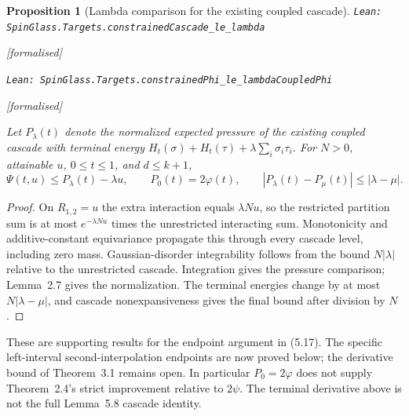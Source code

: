 \documentclass[11pt]{article}
\providecommand{\lean}[1]{\leavevmode\par\nopagebreak
  {\noindent\normalfont\footnotesize\raggedright\texttt{Lean: #1}\par}\nopagebreak}
\providecommand{\leanok}{\par\nopagebreak
  {\noindent\normalfont\footnotesize\textcolor{green!50!black}{[formalised]}\par}\nopagebreak}
\newtheorem{proposition}[theorem]{Proposition}
\begin{document}
\begin{proposition}[Lambda comparison for the existing coupled cascade]
\lean{SpinGlass.Targets.constrainedCascade\_le\_lambda}\leanok
\lean{SpinGlass.Targets.constrainedPhi\_le\_lambdaCoupledPhi}\leanok
Let $P_{\lambda}(t)$ denote the normalized expected pressure of the existing
coupled cascade with terminal energy
$H_t(\sigma)+H_t(\tau)+\lambda\sum_i\sigma_i\tau_i$.
For $N>0$, attainable $u$, $0\le t\le1$, and $d\le k+1$,
\[
\Psi(t,u)\le P_{\lambda}(t)-\lambda u,\qquad
P_0(t)=2\varphi(t),\qquad
|P_{\lambda}(t)-P_{\mu}(t)|\le|\lambda-\mu|.
\]
\end{proposition}
\begin{proof}
On $R_{1,2}=u$ the extra interaction equals $\lambda Nu$, so the restricted
partition sum is at most $e^{-\lambda Nu}$ times the unrestricted interacting
sum. Monotonicity and additive-constant equivariance propagate this through
every cascade level, including zero mass. Gaussian-disorder integrability
follows from the bound $N|\lambda|$ relative to the unrestricted cascade.
Integration gives the pressure comparison; Lemma~2.7 gives the normalization.
The terminal energies change by at most $N|\lambda-\mu|$, and cascade
nonexpansiveness gives the final bound after division by $N$.
\end{proof}

These are supporting results for the endpoint argument in (5.17).
The specific left-interval second-interpolation endpoints are now proved below;
the derivative bound of Theorem~3.1 remains open. In particular $P_0=2\varphi$
does not supply Theorem~2.4's strict improvement relative to $2\psi$.
The terminal derivative above is not the full Lemma~5.8 cascade identity.
\end{document}
